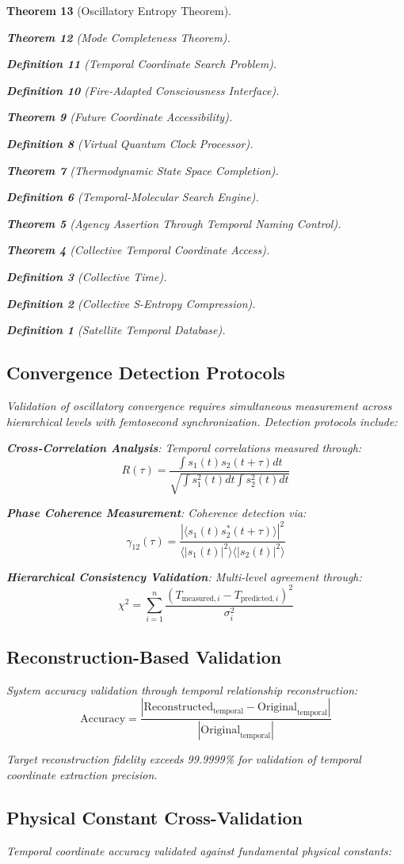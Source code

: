 \documentclass[12pt,a4paper]{article}
\newtheorem{theorem}{Theorem}[section]
\newtheorem{definition}[theorem]{Definition}
\begin{document}
\begin{theorem}[Oscillatory Entropy Theorem]
\begin{theorem}[Mode Completeness Theorem]
\begin{enumerate}
\begin{definition}[Temporal Coordinate Search Problem]
\begin{algorithm}
\begin{definition}[Fire-Adapted Consciousness Interface]
\begin{theorem}[Future Coordinate Accessibility]
\begin{definition}[Virtual Quantum Clock Processor]
\begin{itemize}
\begin{itemize}
\begin{theorem}[Thermodynamic State Space Completion]
\begin{definition}[Temporal-Molecular Search Engine]
\begin{theorem}[Agency Assertion Through Temporal Naming Control]
\begin{remark}
\begin{theorem}[Collective Temporal Coordinate Access]
\begin{definition}[Collective Time]
\begin{definition}[Collective S-Entropy Compression]
\begin{definition}[Satellite Temporal Database]
\begin{algorithm}
\begin{table}[h]
{{\subsection{Convergence Detection Protocols}

Validation of oscillatory convergence requires simultaneous measurement across hierarchical levels with femtosecond synchronization. Detection protocols include:

\textbf{Cross-Correlation Analysis}: Temporal correlations measured through:
$$R(\tau) = \frac{\int s_1(t)s_2(t+\tau) dt}{\sqrt{\int s_1^2(t) dt \int s_2^2(t) dt}}$$

\textbf{Phase Coherence Measurement}: Coherence detection via:
$$\gamma_{12}(\tau) = \frac{|\langle s_1(t)s_2^*(t+\tau)\rangle|^2}{\langle |s_1(t)|^2\rangle\langle |s_2(t)|^2\rangle}$$

\textbf{Hierarchical Consistency Validation}: Multi-level agreement through:
$$\chi^2 = \sum_{i=1}^{n} \frac{(T_{\text{measured},i} - T_{\text{predicted},i})^2}{\sigma_i^2}$$

\subsection{Reconstruction-Based Validation}

System accuracy validation through temporal relationship reconstruction:
$$\text{Accuracy} = \frac{|\text{Reconstructed}_{\text{temporal}} - \text{Original}_{\text{temporal}}|}{|\text{Original}_{\text{temporal}}|}$$

Target reconstruction fidelity exceeds 99.9999\% for validation of temporal coordinate extraction precision.

\subsection{Physical Constant Cross-Validation}

Temporal coordinate accuracy validated against fundamental physical constants:

}}
\end{table}
\end{algorithm}
\end{definition}
\end{definition}
\end{definition}
\end{theorem}
\end{remark}
\end{theorem}
\end{definition}
\end{theorem}
\end{itemize}
\end{itemize}
\end{definition}
\end{theorem}
\end{definition}
\end{algorithm}
\end{definition}
\end{enumerate}
\end{theorem}
\end{theorem}
\end{document}
